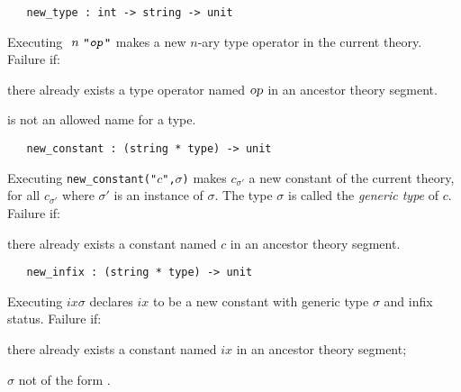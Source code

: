\begin{boxed}
\begin{verbatim}
   new_type : int -> string -> unit
\end{verbatim}\end{boxed}


\noindent Executing $\ n\ \ml{"\ty{op}"}$ makes 
a new $n$-ary type operator in the current theory.
Failure if:
\begin{myenumerate}
\item there already exists a type operator named $\textsl{op}$ in an ancestor
      theory segment.
\item {} is not an allowed name for a type.
\end{myenumerate}


\begin{boxed}
\begin{verbatim}
   new_constant : (string * type) -> unit
\end{verbatim}\end{boxed}

\noindent Executing {\small\verb+new_constant("+}$c${\small\verb+",+}$\sigma${\small\verb+)+} makes
$c_{\sigma'}$ a new constant of the current theory,
for all $c_{\sigma'}$ where $\sigma'$ is an instance of $\sigma$.
The type $\sigma$ is
called the {\it generic type\/} of $c$. Failure if:
\begin{myenumerate}
\item there already exists a constant named $c$ in an ancestor theory segment.
\end{myenumerate}

\begin{boxed}
\begin{verbatim}
   new_infix : (string * type) -> unit
\end{verbatim}\end{boxed}


\noindent Executing $ix$$\sigma$\ml{)}
declares $ix$ to be a new constant with generic type $\sigma$ and
infix status.
Failure if:
\begin{myenumerate}
\item there already exists a constant named $ix$ in an ancestor theory segment;
\item $\sigma$ not of the form .
\end{myenumerate}


